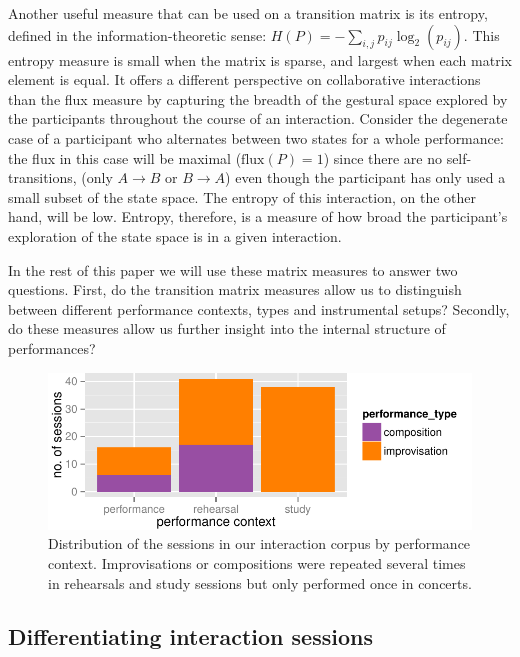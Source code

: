 \documentclass{sigchi}
\begin{document}
Another useful measure that can be used on a transition matrix is its
entropy, defined in the information-theoretic\cite{Shannon:1948rt}
sense: $H(P) = -\sum_{i,j}p_{ij}\log_2(p_{ij})$.
This entropy measure is small when the matrix is sparse, and largest
when each matrix element is equal. It offers a different perspective
on collaborative interactions than the flux measure by capturing the
breadth of the gestural space explored by the participants throughout
the course of an interaction. Consider the degenerate case of a
participant who alternates between two states for a whole performance:
the flux in this case will be maximal ($\mathrm{flux}(P) = 1$) since
there are no self-transitions, (only $A \rightarrow B$ or
$ B \rightarrow A$) even though the participant has only used a small
subset of the state space. The entropy of this interaction, on the
other hand, will be low. Entropy, therefore, is a measure of how broad
the participant's exploration of the state space is in a given
interaction.

In the rest of this paper we will use these matrix measures to answer
two questions. First, do the transition matrix measures allow us to
distinguish between different performance contexts, types and
instrumental setups? Secondly, do these measures allow us further
insight into the internal structure of performances?

\begin{figure}
  \centering
  \includegraphics[width=\linewidth]{figures/sessions-count}
  \caption{Distribution of the sessions in our interaction corpus by
    performance context. Improvisations or compositions were repeated
    several times in rehearsals and study sessions but only performed
    once in concerts.
    \label{fig:count-data}}
\end{figure}


\subsection{Differentiating interaction sessions}
\label{differentiating-interaction-sessions}
\end{document}
